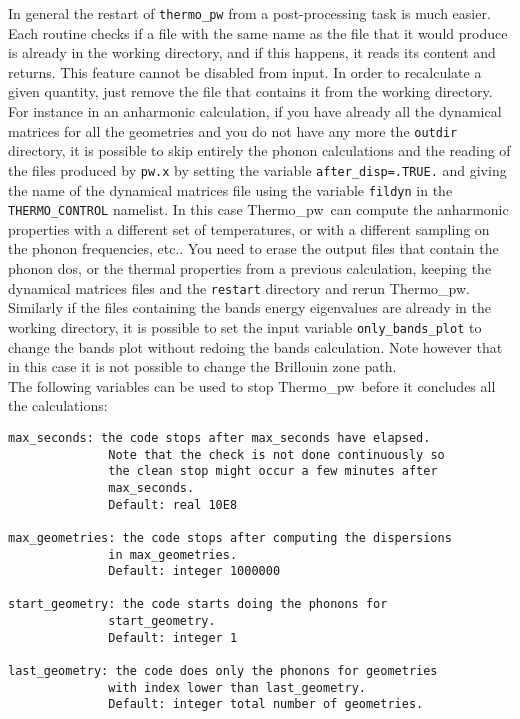 \documentclass[12pt,a4paper,twoside]{report}
\def\thermo{{\sc Thermo\_pw}}
\begin{document}
In general the restart of \texttt{thermo\_pw} from a post-processing task
is much easier.
Each routine checks if a file with the same name
as the file that it would produce is already in the working directory,
and if this happens, it reads its content and returns. This feature cannot be
disabled from input. In order to recalculate a given quantity, just remove
the file that contains it from the working directory.
For instance in an anharmonic calculation, if you have already all 
the dynamical 
matrices for all the geometries and you do not have any more the
\texttt{outdir} directory, it is possible to skip entirely
the phonon calculations and the reading of the files produced by
\texttt{pw.x} by setting the variable
\texttt{after\_disp=.TRUE.} and giving the name of the dynamical matrices file
using the variable \texttt{fildyn} in the \texttt{THERMO\_CONTROL} namelist. 
In this case \thermo\ can compute the anharmonic properties with a 
different set 
of temperatures, or with a different sampling on the phonon frequencies, 
etc.. You need to erase the output files that contain
the phonon dos, or the thermal properties from a previous calculation, keeping 
the dynamical matrices files and the \texttt{restart} directory and 
rerun \thermo.
Similarly if the files containing the bands energy eigenvalues are already
in the working directory, it is possible to set the input variable
\texttt{only\_bands\_plot} to change the bands plot without redoing the
bands calculation. Note however that in this case it is not possible 
to change the Brillouin zone path. \\
The following variables can be used to stop \thermo\ before it concludes all
the calculations:

\begin{verbatim}
max_seconds: the code stops after max_seconds have elapsed. 
              Note that the check is not done continuously so 
              the clean stop might occur a few minutes after 
              max_seconds.
              Default: real 10E8

max_geometries: the code stops after computing the dispersions 
              in max_geometries.
              Default: integer 1000000

start_geometry: the code starts doing the phonons for 
              start_geometry.
              Default: integer 1

last_geometry: the code does only the phonons for geometries 
              with index lower than last_geometry.
              Default: integer total number of geometries.
\end{verbatim}
\end{document}
